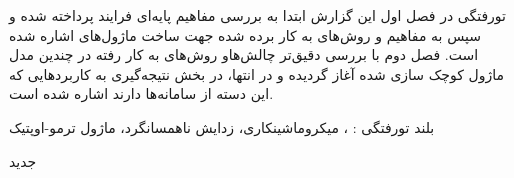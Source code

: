 


\pagestyle{empty}

‌تورفتگی
در فصل اول این گزارش ابتدا به بررسی مفاهیم پایه‌ای فرایند 
پرداخته شده و سپس به مفاهیم و روش‌های به کار برده شده جهت ساخت ماژول‌های  اشاره شده است. فصل دوم با بررسی دقیق‌تر چالش‌هاو روش‌های به کار رفته در چندین مدل ماژول  کوچک سازی شده آغاز گردیده و در انتها، در بخش نتیجه‌گیری به کاربرد‌هایی که این دسته از سامانه‌ها دارند اشاره شده است.

‌بلند
‌تورفتگی : 
، میکروماشینکاری، زدایش ناهمسانگرد،‌ ماژول ترمو-اوپتیک

‌جدید
